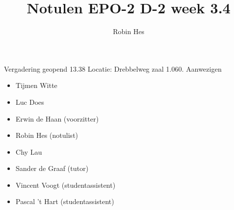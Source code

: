 \documentclass[dutch]{article}
\begin{document}
\title{Notulen EPO-2 D-2 week 3.4}
\author{Robin Hes}

\maketitle
\noindent
Vergadering geopend 13.38 \newline
Locatie: Drebbelweg zaal 1.060.\newline
\newline
Aanwezigen
\begin{itemize}
\item Tijmen Witte 
\item Luc Does 
\item Erwin de Haan (voorzitter)
\item Robin Hes (notulist)
\item Chy Lau
\item Sander de Graaf (tutor)
\item Vincent Voogt (studentassistent)
\item Pascal 't Hart (studentassistent)
\end{itemize}
\end{document}
